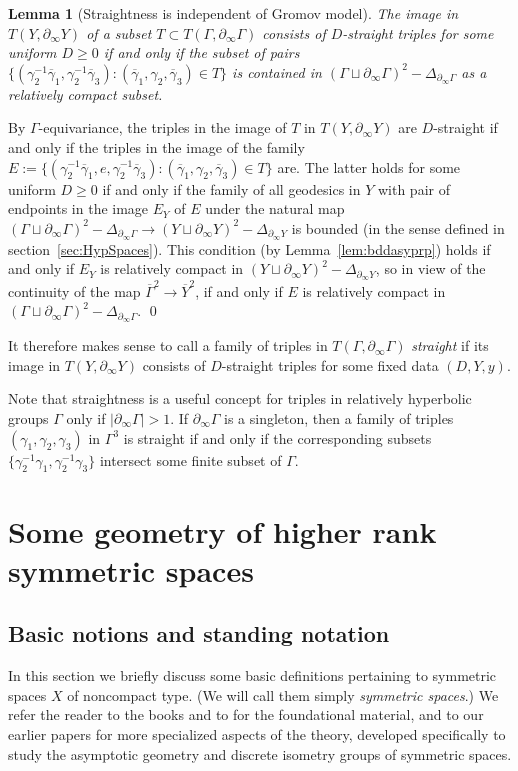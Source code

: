 \documentclass[12pt]{article}
\theoremstyle{boldplain}
\newtheorem{lemma}[equation]{Lemma}
\theoremstyle{bolddefinition}
\numberwithin{equation}{section}
\def\ga{\gamma}
\def\Ga{\Gamma}
\def\De{\Delta}
\def\geo{\partial_{\infty}}
\def\ol{\overline}
\begin{document}
\begin{lemma}[Straightness is independent of Gromov model] 
\label{lem:instr}
The image in 
$T(Y, \geo Y)$
of a subset 
$T\subset T(\Ga, \geo\Ga)$ 
consists of $D$-straight triples for some uniform $D\geq0$
if and only if the subset of pairs 
$\{(\ga_2^{-1}\ol\ga_1,\ga_2^{-1}\ol\ga_3):(\ol\ga_1,\ga_2,\ol\ga_3)\in T\}$
is contained in $(\Ga\sqcup\geo\Ga)^2 - \De_{\geo\Ga}$
as a relatively compact subset.
\end{lemma}
\proof 
By $\Ga$-equivariance, 
the triples in the image of 
$T$ in $T(Y, \geo Y)$
are $D$-straight if and only if the triples in the image of the family 
$E:=\{(\ga_2^{-1}\ol\ga_1,e,\ga_2^{-1}\ol\ga_3): (\ol\ga_1,\ga_2,\ol\ga_3)\in T\}$ are. 
The latter holds for some uniform $D\geq0$ 
if and only if 
the family of all geodesics in $Y$ with pair of endpoints 
in the image $E_Y$ of $E$  
under the natural map 
$(\Ga\sqcup\geo\Ga)^2 - \De_{\geo\Ga} \to (Y\sqcup\geo Y)^2 - \De_{\geo Y}$
is bounded 
(in the sense defined in section~\ref{sec:HypSpaces}). 
This condition (by Lemma~\ref{lem:bddasyprp}) holds  
if and only if $E_Y$ is relatively compact in 
$(Y\sqcup\geo Y)^2 - \De_{\geo Y}$,
so in view of the continuity of the map $\ol\Ga^2\to\ol Y^2$,
if and only if $E$ is relatively compact in 
$(\Ga\sqcup\geo\Ga)^2 - \De_{\geo\Ga}$.
\qed

\medskip
It therefore makes sense to call a family of triples in 
$T(\Ga, \geo\Ga)$ 
{\em straight} if its image in 
$T(Y, \geo Y)$
consists of $D$-straight triples for some fixed data $(D,Y,y)$.

Note that straightness is a useful concept for triples in relatively hyperbolic groups $\Ga$ only if $|\geo \Ga|>1$.
If $\geo\Ga$ is a singleton, then 
a family of triples $(\ga_1, \ga_2, \ga_3)$ in $\Ga^3$ is straight if and only if
the corresponding subsets $\{\ga_2^{-1}\ga_1,\ga_2^{-1}\ga_3\}$ intersect some finite subset of $\Ga$.



\section{Some geometry of higher rank symmetric spaces}

\subsection{Basic notions and standing notation}

In this section we briefly discuss some 
basic definitions pertaining to symmetric spaces $X$ of noncompact type.
(We will call them simply {\em symmetric spaces}.)
We refer the reader to the books \cite{Helgason,Eberlein} and to \cite{habil} for the foundational material,
and to our earlier papers \cite{morse,mlem,coco15,anolec,bordif,manicures} for more specialized aspects of the theory,
developed specifically to study the asymptotic geometry and discrete isometry groups of symmetric spaces.  
\end{document}
